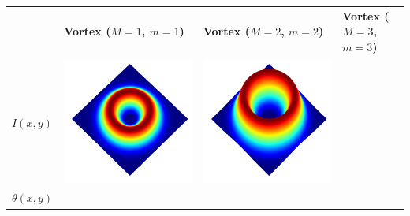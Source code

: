 \documentclass[a4paper, 12pt]{article}
\begin{document}
\begin{center}
\begin{tabular}{M{1cm}M{5cm}M{5cm}M{5cm}}
\ & \textbf{Vortex ($M=1$, $m=1$)} & \textbf{Vortex ($M=2$, $m=2$)} & \textbf{Vortex ($M=3$, $m=3$)} \\
$I(x,y)$ &
\includegraphics[width=\linewidth]{../resources/intensity_M=2.png} & 
\includegraphics[width=\linewidth]{../resources/intensity_M=3.png} \\
$\theta(x,y)$ &
& 
& 
\end{tabular}
\end{center}
\end{document}
